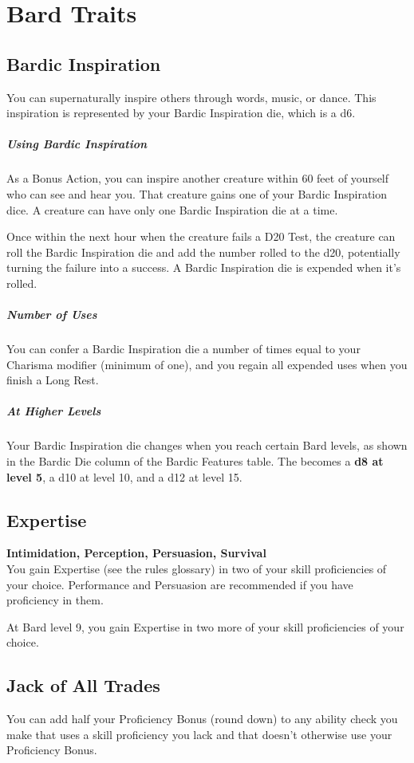 \documentclass[letterpaper,openany,oneside,twocolumn]{book}
\begin{document}
\section*{Bard Traits}
\subsection*{Bardic Inspiration}
You can supernaturally inspire others through words, music, or dance. This inspiration is represented by your Bardic Inspiration die, which is a d6.
\subparagraph*{Using Bardic Inspiration}
As a Bonus Action, you can inspire another creature within 60 feet of yourself who can see and hear you. That creature gains one of your Bardic Inspiration dice. A creature can have only one Bardic Inspiration die at a time.

Once within the next hour when the creature fails a D20 Test, the creature can roll the Bardic Inspiration die and add the number rolled to the d20, potentially turning the failure into a success. A Bardic Inspiration die is expended when it's rolled.
\subparagraph*{Number of Uses}
You can confer a Bardic Inspiration die a number of times equal to your Charisma modifier (minimum of one), and you regain all expended uses when you finish a Long Rest.
\subparagraph*{At Higher Levels}
Your Bardic Inspiration die changes when you reach certain Bard levels, as shown in the Bardic Die column of the Bardic Features table. The becomes a \textbf{d8 at level 5}, a d10 at level 10, and a d12 at level 15.

\subsection*{Expertise}
\textbf{Intimidation, Perception, Persuasion, Survival}\\
You gain Expertise (see the rules glossary) in two of your skill proficiencies of your choice. Performance and Persuasion are recommended if you have proficiency in them.

At Bard level 9, you gain Expertise in two more of your skill proficiencies of your choice.

\subsection*{Jack of All Trades}
You can add half your Proficiency Bonus (round down) to any ability check you make that uses a skill proficiency you lack and that doesn't otherwise use your Proficiency Bonus.
\end{document}
